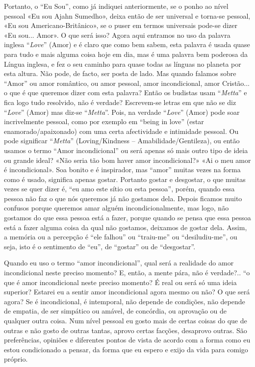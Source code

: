 Portanto, o ``Eu Sou'', como já indiquei anteriormente, se o ponho ao
nível pessoal «Eu sou Ajahn Sumedho», deixa então de ser universal e
torna-se pessoal, «Eu sou Americano-Britânico», se o puser em termos
universais pode-se dizer «Eu sou... Amor». O que será isso? Agora aqui
entramos no uso da palavra inglesa ``\emph{Love}'' (Amor) e é claro que
como bem sabem, esta palavra é usada quase para tudo e mais alguma coisa
hoje em dia, mas é uma palavra bem poderosa da Língua inglesa, e fez o
seu caminho para quase todas as línguas no planeta por esta altura. Não
pode, de facto, ser posta de lado. Mas quando falamos sobre ``Amor'' ou
amor romântico, ou amor pessoal, amor incondicional, amor Cristão... o
que é que queremos dizer com esta palavra? Então os budistas usam
``\emph{Metta}'' e fica logo tudo resolvido, não é verdade? Escrevem-se
letras em que não se diz ``\emph{Love}'' (Amor) mas diz-se
``\emph{Metta}''. Pois, na verdade ``\emph{Love}'' (Amor) pode soar
incrivelmente pessoal, como por exemplo em ``being in love'' (estar
enamorado/apaixonado) com uma certa afectividade e intimidade pessoal.
Ou pode significar ``\emph{Metta}'' (Loving/Kindness --
Amabilidade/Gentileza), ou então usamos o termo ``Amor incondicional''
ou será apenas só mais outro tipo de ideia ou grande ideal? «Não seria
tão bom haver amor incondicional?» «Ai o meu amor é incondicional». Soa
bonito e é inspirador, mas ``amor'' muitas vezes na forma como é usado,
significa apenas gostar. Portanto gostar e desgostar, o que muitas vezes
se quer dizer é, ``eu amo este sítio ou esta pessoa'', porém, quando
essa pessoa não faz o que nós queremos já não gostamos dela. Depois
ficamos muito confusos porque queremos amar alguém incondicionalmente,
mas logo, não gostamos do que essa pessoa está a fazer, porque quando se
pensa que essa pessoa está a fazer alguma coisa da qual não gostamos,
deixamos de gostar dela. Assim, a memória ou a percepção é ``ele
falhou'' ou ``traiu-me'' ou ``desiludiu-me'', ou seja, isto é o
sentimento de ``eu'', de ``gostar'' ou de ``desgostar''.

Quando eu uso o termo ``amor incondicional'', qual será a realidade do
amor incondicional neste preciso momento? E, então, a mente pára, não é
verdade?.. ``o que é amor incondicional neste preciso momento? É real ou
será só uma ideia superior? Estarei eu a sentir amor incondicional agora
mesmo ou não? O que será agora? Se é incondicional, é intemporal, não
depende de condições, não depende de empatia, de ser simpático ou
amável, de concórdia, ou aprovação ou de qualquer outra coisa. Num nível
pessoal eu gosto mais de certas coisas do que de outras e não gosto de
outras tantas, aprovo certas facções, desaprovo outras. São
preferências, opiniões e diferentes pontos de vista de acordo com a
forma como eu estou condicionado a pensar, da forma que eu espero e
exijo da vida para comigo próprio.

